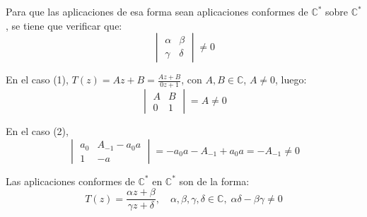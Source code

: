 Para que las aplicaciones de esa forma sean aplicaciones conformes de $\mathbb{C}^\ast$ sobre $\mathbb{C}^\ast$, se tiene que verificar que:
$$\begin{vmatrix}
        \alpha & \beta  \\
        \gamma & \delta
    \end{vmatrix} \neq 0$$

En el caso (1), $T(z) = Az + B = \frac{Az + B}{0z + 1}$, con $A, B \in \mathbb{C}$, $A \neq 0$, luego:
$$\begin{vmatrix}
        A & B \\
        0 & 1
    \end{vmatrix} = A \neq 0$$

En el caso (2),
$$\begin{vmatrix}
        a_0 & A_{-1} - a_0a \\
        1   & -a
    \end{vmatrix} = -a_0a - A_{-1} + a_0a = -A_{-1} \neq 0$$

\begin{theorem}
    Las aplicaciones conformes de $\mathbb{C}^\ast$ en $\mathbb{C}^\ast$ son de la forma:
    $$T(z) = \frac{\alpha z + \beta}{\gamma z + \delta}, \quad \alpha, \beta, \gamma, \delta \in \mathbb{C}, \; \alpha\delta - \beta\gamma \neq 0$$
\end{theorem}

